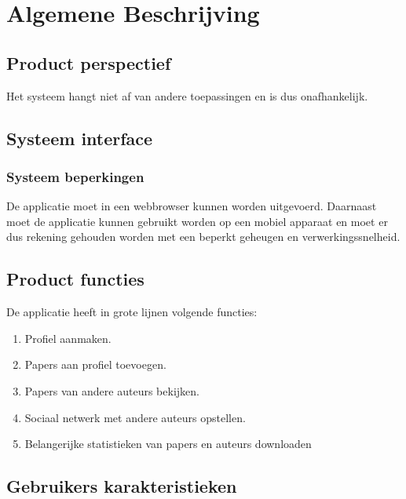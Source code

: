 \section{Algemene Beschrijving}

\subsection{Product perspectief}

Het systeem hangt niet af van andere toepassingen en is dus onafhankelijk.


\subsection{Systeem interface}

\subsubsection{Systeem beperkingen}

De applicatie moet in een webbrowser kunnen worden uitgevoerd. Daarnaast moet de applicatie kunnen gebruikt worden op een mobiel apparaat en moet er dus rekening gehouden worden met een beperkt geheugen en verwerkingssnelheid.

\subsection{Product functies}

De applicatie heeft in grote lijnen volgende functies:


\begin{enumerate}
\item Profiel aanmaken.
\item Papers aan profiel toevoegen.
\item Papers van andere auteurs bekijken.
\item Sociaal netwerk met andere auteurs opstellen.
\item Belangerijke statistieken van papers en auteurs downloaden
\end{enumerate}


\subsection{Gebruikers karakteristieken}

